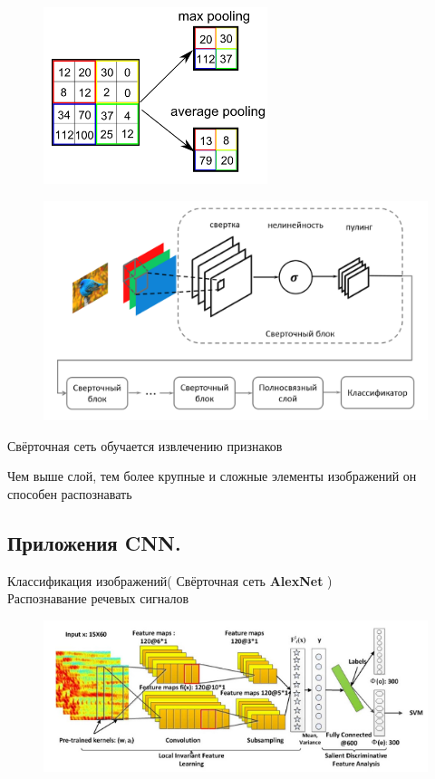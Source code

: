 \begin{description}
\begin{figure}[h]
\centering

\includegraphics[width=0.2\linewidth]{chapters/neural/images/пуллинг.png}

\label{fig:pulling}

\end{figure}

\begin{figure}[h]

\centering

\includegraphics[width=0.8\linewidth]{chapters/neural/images/1CNN.png}

\label{fig:one_cnn}

\end{figure}

Свёрточная сеть обучается извлечению признаков

Чем выше слой, тем более крупные и сложные элементы изображений он способен распознавать

\newpage
\subsection{Приложения CNN.}

Классификация изображений( Свёрточная сеть \textbf{AlexNet} )\\

Распознавание речевых сигналов\\
\begin{figure}[h]

\centering

\includegraphics[width=0.8\linewidth]{chapters/neural/images/pic.png}


\end{figure}
\end{description}
